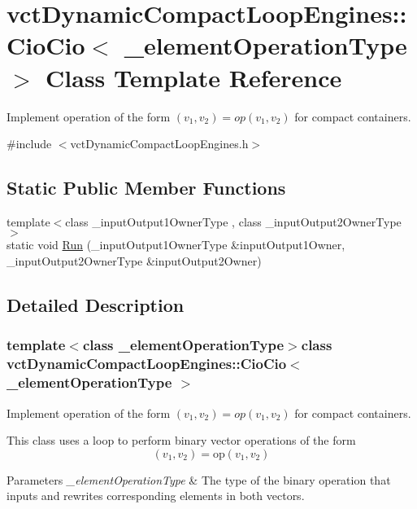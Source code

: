 \hypertarget{classvct_dynamic_compact_loop_engines_1_1_cio_cio}{}\section{vct\+Dynamic\+Compact\+Loop\+Engines\+:\+:Cio\+Cio$<$ \+\_\+element\+Operation\+Type $>$ Class Template Reference}
\label{classvct_dynamic_compact_loop_engines_1_1_cio_cio}


Implement operation of the form $(v_{1}, v_{2}) = op(v_{1}, v_{2})$ for compact containers.  




{\ttfamily \#include $<$vct\+Dynamic\+Compact\+Loop\+Engines.\+h$>$}

\subsection*{Static Public Member Functions}
\begin{DoxyCompactItemize}
\item 
{\footnotesize template$<$class \+\_\+input\+Output1\+Owner\+Type , class \+\_\+input\+Output2\+Owner\+Type $>$ }\\static void \hyperlink{classvct_dynamic_compact_loop_engines_1_1_cio_cio_a3b40ac822d54540352aaa259fe00bf7e}{Run} (\+\_\+input\+Output1\+Owner\+Type \&input\+Output1\+Owner, \+\_\+input\+Output2\+Owner\+Type \&input\+Output2\+Owner)
\end{DoxyCompactItemize}


\subsection{Detailed Description}
\subsubsection*{template$<$class \+\_\+element\+Operation\+Type$>$class vct\+Dynamic\+Compact\+Loop\+Engines\+::\+Cio\+Cio$<$ \+\_\+element\+Operation\+Type $>$}

Implement operation of the form $(v_{1}, v_{2}) = op(v_{1}, v_{2})$ for compact containers. 

This class uses a loop to perform binary vector operations of the form \[ (v_{1}, v_{2}) = \mathrm{op}(v_{1}, v_{2}) \]


\begin{DoxyParams}{Parameters}
{\em \+\_\+element\+Operation\+Type} & The type of the binary operation that inputs and rewrites corresponding elements in both vectors. \\
\hline
\end{DoxyParams}


